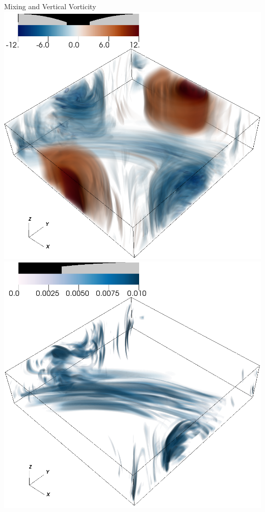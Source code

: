 \documentclass[aspecttatio=169]{beamer}
\begin{document}
\begin{frame}{Mixing and Vertical Vorticity}
        \includegraphics[width=.95\textwidth]{images/vortz_Om10_vr2.png}
        \includegraphics[width=.95\textwidth]{images/chi_Om10_vr2.png}
    \emp

\end{frame}
\end{document}
